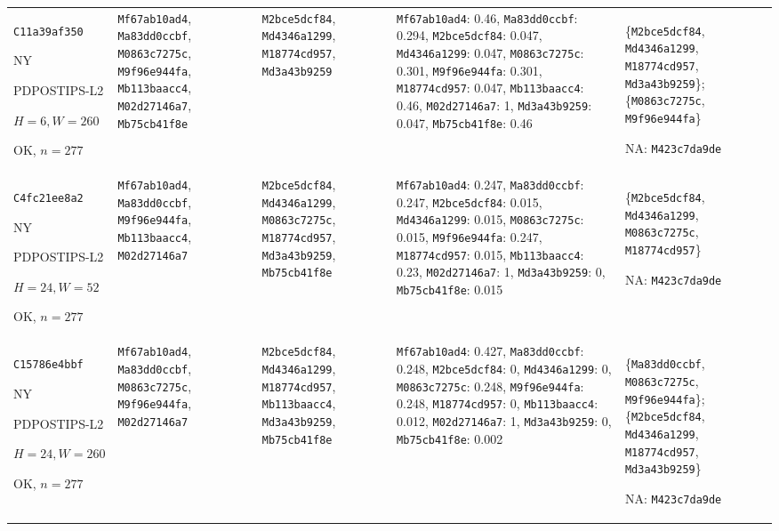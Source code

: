 \begin{longtable}{p{.15\linewidth}p{.17\linewidth}p{.17\linewidth}p{.25\linewidth}p{.14\linewidth}}
\texttt{C11a39af350}\par NY\par PDPOSTIPS-\allowbreak{}L2\par $H=6,W=260$\par OK, $n=277$ & \texttt{Mf67ab10ad4}, \texttt{Ma83dd0ccbf}, \texttt{M0863c7275c}, \texttt{M9f96e944fa}, \texttt{Mb113baacc4}, \texttt{M02d27146a7}, \texttt{Mb75cb41f8e} & \texttt{M2bce5dcf84}, \texttt{Md4346a1299}, \texttt{M18774cd957}, \texttt{Md3a43b9259} & \texttt{Mf67ab10ad4}: 0.46, \texttt{Ma83dd0ccbf}: 0.294, \texttt{M2bce5dcf84}: 0.047, \texttt{Md4346a1299}: 0.047, \texttt{M0863c7275c}: 0.301, \texttt{M9f96e944fa}: 0.301, \texttt{M18774cd957}: 0.047, \texttt{Mb113baacc4}: 0.46, \texttt{M02d27146a7}: 1, \texttt{Md3a43b9259}: 0.047, \texttt{Mb75cb41f8e}: 0.46 & \{\texttt{M2bce5dcf84}, \texttt{Md4346a1299}, \texttt{M18774cd957}, \texttt{Md3a43b9259}\}; \{\texttt{M0863c7275c}, \texttt{M9f96e944fa}\}\par NA: \texttt{M423c7da9de} \\
\texttt{C4fc21ee8a2}\par NY\par PDPOSTIPS-\allowbreak{}L2\par $H=24,W=52$\par OK, $n=277$ & \texttt{Mf67ab10ad4}, \texttt{Ma83dd0ccbf}, \texttt{M9f96e944fa}, \texttt{Mb113baacc4}, \texttt{M02d27146a7} & \texttt{M2bce5dcf84}, \texttt{Md4346a1299}, \texttt{M0863c7275c}, \texttt{M18774cd957}, \texttt{Md3a43b9259}, \texttt{Mb75cb41f8e} & \texttt{Mf67ab10ad4}: 0.247, \texttt{Ma83dd0ccbf}: 0.247, \texttt{M2bce5dcf84}: 0.015, \texttt{Md4346a1299}: 0.015, \texttt{M0863c7275c}: 0.015, \texttt{M9f96e944fa}: 0.247, \texttt{M18774cd957}: 0.015, \texttt{Mb113baacc4}: 0.23, \texttt{M02d27146a7}: 1, \texttt{Md3a43b9259}: 0, \texttt{Mb75cb41f8e}: 0.015 & \{\texttt{M2bce5dcf84}, \texttt{Md4346a1299}, \texttt{M0863c7275c}, \texttt{M18774cd957}\}\par NA: \texttt{M423c7da9de} \\
\texttt{C15786e4bbf}\par NY\par PDPOSTIPS-\allowbreak{}L2\par $H=24,W=260$\par OK, $n=277$ & \texttt{Mf67ab10ad4}, \texttt{Ma83dd0ccbf}, \texttt{M0863c7275c}, \texttt{M9f96e944fa}, \texttt{M02d27146a7} & \texttt{M2bce5dcf84}, \texttt{Md4346a1299}, \texttt{M18774cd957}, \texttt{Mb113baacc4}, \texttt{Md3a43b9259}, \texttt{Mb75cb41f8e} & \texttt{Mf67ab10ad4}: 0.427, \texttt{Ma83dd0ccbf}: 0.248, \texttt{M2bce5dcf84}: 0, \texttt{Md4346a1299}: 0, \texttt{M0863c7275c}: 0.248, \texttt{M9f96e944fa}: 0.248, \texttt{M18774cd957}: 0, \texttt{Mb113baacc4}: 0.012, \texttt{M02d27146a7}: 1, \texttt{Md3a43b9259}: 0, \texttt{Mb75cb41f8e}: 0.002 & \{\texttt{Ma83dd0ccbf}, \texttt{M0863c7275c}, \texttt{M9f96e944fa}\}; \{\texttt{M2bce5dcf84}, \texttt{Md4346a1299}, \texttt{M18774cd957}, \texttt{Md3a43b9259}\}\par NA: \texttt{M423c7da9de} \\

\end{longtable}
